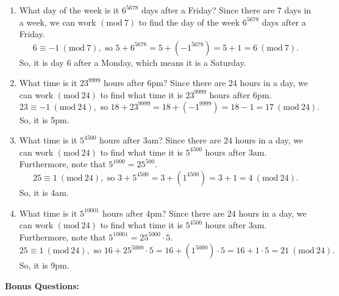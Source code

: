 \documentclass{article}
\begin{document}
\begin{enumerate}
\begin{enumerate}
    			\item What day of the week is it $6^{5678}$ days after a Friday? \ppar
                        Since there are $7$ days in a week, we can work $(\mathrm{mod}\ 7)$ to find the day of the week $6^{5678}$ days after a Friday.
                            \[
                                6 \equiv \minus1\ (\mathrm{mod}\ 7), \text{ so }5 + 6^{5678} = 5 + (\minus1^{5678}) = 5 + 1 = 6\ (\mathrm{mod}\ 7).
                            \]
                        So, it is day $6$ after a Monday, which means it is a Saturday.
                        
    			\item What time is it $23^{9999}$ hours after 6pm? \ppar
                        Since there are $24$ hours in a day, we can work $(\mathrm{mod}\ 24)$ to find what time it is $23^{9999}$ hours after 6pm.
                            \[
                                23 \equiv \minus1\ (\mathrm{mod}\ 24), \text{ so }18 + 23^{9999} = 18 + (\minus1^{9999}) = 18 - 1 = 17\ (\mathrm{mod}\ 24).
                            \]
                        So, it is 5pm.
                    
    			\item What time is it $5^{4500}$ hours after 3am? \ppar
                        Since there are $24$ hours in a day, we can work $(\mathrm{mod}\ 24)$ to find what time it is $5^{4500}$ hours after 3am. Furthermore, note that $5^{1000} = 25^{500}$.
                            \[
                                25 \equiv 1\ (\mathrm{mod}\ 24), \text{ so }3 + 5^{4500} = 3 + (1^{4500}) = 3 + 1 = 4\ (\mathrm{mod}\ 24).
                            \]
                        So, it is 4am.
       
    			\item What time is it $5^{10001}$ hours after 4pm? \ppar
                        Since there are $24$ hours in a day, we can work $(\mathrm{mod}\ 24)$ to find what time it is $5^{4500}$ hours after 3am. Furthermore, note that $5^{10001} = 25^{5000} \cdot 5$.
                            \[
                                25 \equiv 1\ (\mathrm{mod}\ 24), \text{ so }16 + 25^{5000} \cdot 5 = 16 + (1^{5000}) \cdot 5 = 16 + 1\cdot 5 = 21\ (\mathrm{mod}\ 24).
                            \]
                        So, it is 9pm.
    		\end{enumerate}
    \end{enumerate}
    
    \newpage
    \textbf{Bonus Questions:}
    
\end{document}

